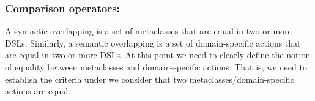 

\subsubsection{Comparison operators:} A syntactic overlapping is a set of metaclasses that are equal in two or more DSLs. Similarly, a semantic overlapping is a set of domain-specific actions that are equal in two or more DSLs. At this point we need to clearly define the notion of equality between metaclasses and domain-specific actions. That is, we need to establish the criteria under we consider that two metaclasses/domain-specific actions are equal.

